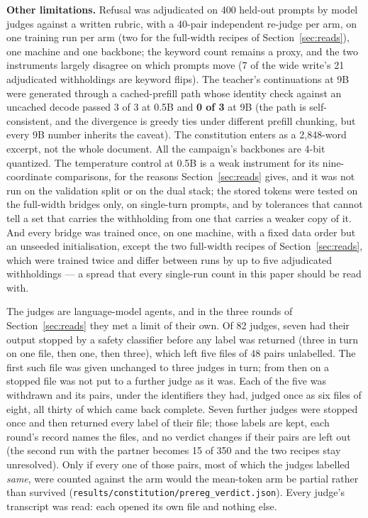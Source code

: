 \documentclass[11pt]{article}
\newcommand{\code}[1]{\texttt{#1}}
\begin{document}
\textbf{Other limitations.} Refusal was adjudicated on 400 held-out prompts by
model judges against a written rubric, with a 40-pair independent re-judge per arm,
on one training run per arm (two for the full-width recipes of
Section~\ref{sec:reads}), one machine and one backbone; the keyword count remains a proxy, and
the two instruments largely disagree on which prompts move (7 of the wide write's
21 adjudicated withholdings are keyword flips). The teacher's continuations at 9B were
generated through a cached-prefill path whose identity check against an uncached
decode passed 3 of 3 at 0.5B and \textbf{0 of 3} at 9B (the path is self-consistent,
and the divergence is greedy ties under different prefill chunking, but every 9B
number inherits the caveat). The constitution enters as a 2{,}848-word excerpt, not
the whole document. All the campaign's backbones are 4-bit quantized. The
temperature control at 0.5B is a weak instrument for its nine-coordinate
comparisons, for the reasons Section~\ref{sec:reads} gives, and it was not run on
the validation split or on the dual stack; the stored tokens were tested on the
full-width bridges only, on single-turn prompts, and by tolerances that cannot
tell a set that carries the withholding from one that carries a weaker copy of
it. And every bridge was trained once,
on one machine, with a fixed data order but an unseeded initialisation, except the
two full-width recipes of Section~\ref{sec:reads}, which were trained twice and differ between runs by up to five adjudicated withholdings
--- a spread that every single-run count in this paper should be read with.

The judges are language-model agents, and in the three rounds of
Section~\ref{sec:reads} they met a limit of their own. Of 82 judges, seven had their output
stopped by a safety classifier before any label was returned (three in turn on one
file, then one, then three), which left five files of 48 pairs unlabelled. The
first such file was given unchanged to three judges in turn; from then on a stopped
file was not put to a further judge as it was. Each of the five was withdrawn and
its pairs, under the identifiers they had, judged once as six files of eight, all
thirty of which came back complete. Seven further judges were stopped once and then
returned every label of their file; those labels are kept, each round's record
names the files, and no verdict changes if their pairs are left out (the second run
with the partner becomes 15 of 350 and the two recipes stay unresolved). Only if
every one of those pairs, most of which the judges labelled \emph{same}, were
counted against the arm would the mean-token arm be partial rather than survived
(\code{results/\allowbreak{}constitution/\allowbreak{}prereg\_verdict.json}).
Every judge's transcript was read: each opened its own file and nothing else.
\end{document}
